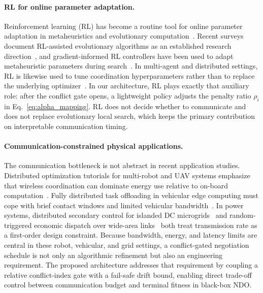 \documentclass[conference]{IEEEtran}
\begin{document}
\paragraph{RL for online parameter adaptation.}
Reinforcement learning (RL) has become a routine tool for online parameter adaptation in metaheuristics and evolutionary computation~\cite{ref_karafotias_param_control,ref_rl_ea_survey_2024,ref_rl_metaheuristic_2023}. Recent surveys document RL-assisted evolutionary algorithms as an established research direction~\cite{ref_rl_ea_survey_2024}, and gradient-informed RL controllers have been used to adapt metaheuristic parameters during search~\cite{ref_rl_metaheuristic_2023}. In multi-agent and distributed settings, RL is likewise used to tune coordination hyperparameters rather than to replace the underlying optimizer~\cite{ref_sutton_barto}. In our architecture, RL plays exactly that auxiliary role: after the conflict gate opens, a lightweight policy adjusts the penalty ratio $\rho_i$ in Eq.~\eqref{eq:alpha_mapping}. RL does not decide whether to communicate and does not replace evolutionary local search, which keeps the primary contribution on interpretable communication timing.

\paragraph{Communication-constrained physical applications.}
The communication bottleneck is not abstract in recent application studies. Distributed optimization tutorials for multi-robot and UAV systems emphasize that wireless coordination can dominate energy use relative to on-board computation~\cite{ref_dopt_robotics_2024}. Fully distributed task offloading in vehicular edge computing must cope with brief contact windows and limited vehicular bandwidth~\cite{ref_dopt_iov_2024}. In power systems, distributed secondary control for islanded DC microgrids~\cite{ref_dopt_smartgrid_2024} and random-triggered economic dispatch over wide-area links~\cite{ref_ndo_dispatch_2024} both treat transmission rate as a first-order design constraint. Because bandwidth, energy, and latency limits are central in these robot, vehicular, and grid settings, a conflict-gated negotiation schedule is not only an algorithmic refinement but also an engineering requirement. The proposed architecture addresses that requirement by coupling a relative conflict-index gate with a fail-safe drift bound, enabling direct trade-off control between communication budget and terminal fitness in black-box NDO.
\end{document}
